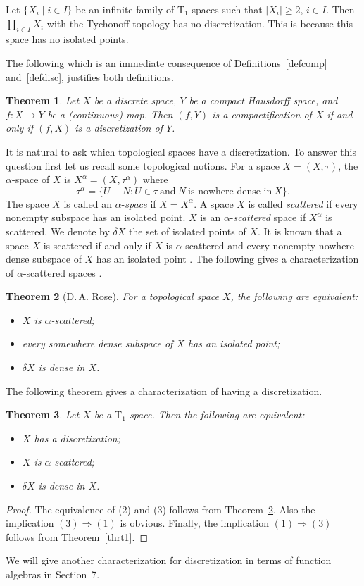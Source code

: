 \documentclass[manuscript]{amsart}
\newtheorem{theorem}{Theorem}[section]
\theoremstyle{definition}
\begin{document}
Let $\{X_{i}\mid i\in I\}$ be an infinite family of $\mathrm{T}_{1}$  spaces
such that $|X_{i}|\geq 2$, $i\in I$. Then $\prod_{i\in I}X_{i}$ with the Tychonoff
topology has no discretization. This is because this space has no isolated points.

The following which is an immediate consequence of Definitions~\ref{defcomp} and~\ref{defdisc},
justifies both definitions.

\begin{theorem}\label{thrdiscom}
Let $X$ be a discrete space, $Y$ be a compact Hausdorff space, and $f:X\to Y$ be a (continuous) map.
Then $(f,Y)$ is a  compactification
of $X$ if and only if $(f,X)$ is a  discretization of $Y$.
\end{theorem}
It is natural to ask  which topological spaces have a discretization.
To answer this question first let us recall some topological notions. For a space $X=(X,\tau)$,
the $\alpha$-space of $X$ is
$X^{\alpha}=(X,\tau^{\alpha})$ where
\[
\tau^{\alpha}=\{U-N: U\in \tau\ \text{and}\ N\ \text{is nowhere dense in}\  X\}.
\]
The space $X$ is called an $\alpha$-\emph{space} if $X=X^{\alpha}$.
A space $X$ is called \emph{scattered} if every nonempty subspace has an isolated point.
$X$   is an $\alpha$-\emph{scattered} space if $X^{\alpha}$ is scattered.
We denote by $\delta X$  the set of isolated points of $X$.
It is known that
a space $X$ is scattered if and only if $X$ is $\alpha$-scattered and every nonempty nowhere
dense subspace of $X$ has an isolated point \cite[Theorem~2.1]{ro98}.
The following  gives a characterization of $\alpha$-scattered spaces \cite{ro98}.

\begin{theorem}[D.\,A. Rose]\label{thrrose}
For a topological space $X$, the following are equivalent:
\begin{itemize}
\item[(1)]
$X$ is $\alpha$-scattered;
\item[(2)] every somewhere dense subspace of $X$ has an isolated point;
\item[(3)] $\delta X$ is dense in $X$.
\end{itemize}
\end{theorem}
The following theorem gives a characterization of having a discretization.
\begin{theorem}\label{thrchdisc}
Let $X$ be a $\mathrm{T}_{1}$ space. Then the following   are equivalent:
\begin{itemize}
\item[(1)]
$X$ has a discretization;
\item[(2)]
$X$ is $\alpha$-scattered;
\item[(3)]
$\delta X$  is dense in $X$.
\end{itemize}
\end{theorem}
\begin{proof}
The equivalence of (2) and (3) follows from Theorem~\ref{thrrose}.
Also the implication $(3)\Rightarrow (1)$ is obvious.
Finally, the implication $(1)\Rightarrow (3)$ follows from Theorem~\ref{thrt1}.
\end{proof}
We will give another characterization for discretization in terms of function algebras in
 Section~7.
\end{document}
